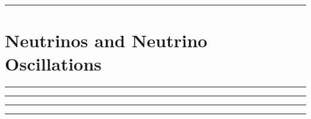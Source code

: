 
\noindent\rule{7in}{2.8pt}
\section{Neutrinos and Neutrino Oscillations}
    
\begin{problem}{13.0}

\end{problem}

\begin{solution}


\end{solution}

\noindent\rule{7in}{1.5pt}


\begin{problem}{13.1}

\end{problem}

\begin{solution}


\end{solution}

\noindent\rule{7in}{1.5pt}


\begin{problem}{13.2}

\end{problem}

\begin{solution}


\end{solution}

\noindent\rule{7in}{1.5pt}


\begin{problem}{13.3}

\end{problem}

\begin{solution}


\end{solution}

\noindent\rule{7in}{1.5pt}

